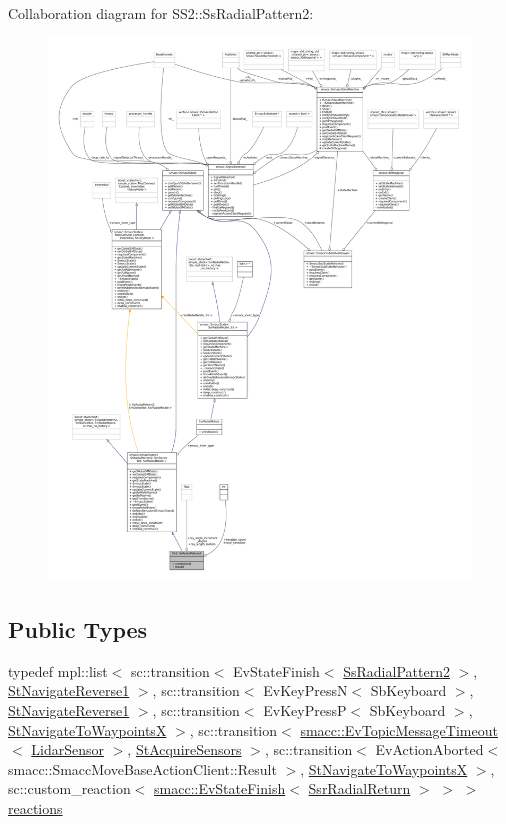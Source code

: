 Collaboration diagram for S\+S2\+:\+:Ss\+Radial\+Pattern2\+:
\nopagebreak
\begin{figure}[H]
\begin{center}
\leavevmode
\includegraphics[width=350pt]{structSS2_1_1SsRadialPattern2__coll__graph}
\end{center}
\end{figure}
\subsection*{Public Types}
\begin{DoxyCompactItemize}
\item 
typedef mpl\+::list$<$ sc\+::transition$<$ Ev\+State\+Finish$<$ \hyperlink{structSS2_1_1SsRadialPattern2}{Ss\+Radial\+Pattern2} $>$, \hyperlink{structStNavigateReverse1}{St\+Navigate\+Reverse1} $>$, sc\+::transition$<$ Ev\+Key\+PressN$<$ Sb\+Keyboard $>$, \hyperlink{structStNavigateReverse1}{St\+Navigate\+Reverse1} $>$, sc\+::transition$<$ Ev\+Key\+PressP$<$ Sb\+Keyboard $>$, \hyperlink{structStNavigateToWaypointsX}{St\+Navigate\+To\+WaypointsX} $>$, sc\+::transition$<$ \hyperlink{structsmacc_1_1EvTopicMessageTimeout}{smacc\+::\+Ev\+Topic\+Message\+Timeout}$<$ \hyperlink{sensor__state_8h_a9db9e1944f88de79507758d08e4a2ee3}{Lidar\+Sensor} $>$, \hyperlink{structStAcquireSensors}{St\+Acquire\+Sensors} $>$, sc\+::transition$<$ Ev\+Action\+Aborted$<$ smacc\+::\+Smacc\+Move\+Base\+Action\+Client\+::\+Result $>$, \hyperlink{structStNavigateToWaypointsX}{St\+Navigate\+To\+WaypointsX} $>$, sc\+::custom\+\_\+reaction$<$ \hyperlink{structsmacc_1_1EvStateFinish}{smacc\+::\+Ev\+State\+Finish}$<$ \hyperlink{structSsrRadialReturn}{Ssr\+Radial\+Return} $>$ $>$ $>$ \hyperlink{structSS2_1_1SsRadialPattern2_a2985318d1db3c33ac40ccc6fe481639a}{reactions}
\end{DoxyCompactItemize}
